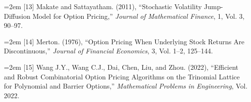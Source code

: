 \begin{flushleft}
\hangindent=2em
[13] Makate and Sattayatham. (2011), “Stochastic Volatility Jump-Diffusion Model for Option Pricing,” \emph{Journal of Mathematical Finance}, 1, Vol. 3, 90–97.

\hangindent=2em
[14] Merton. (1976), “Option Pricing When Underlying Stock Returns Are Discontinuous,” \emph{Journal of Financial Economics}, 3, Vol. 1–2, 125–144.

\hangindent=2em
[15] Wang J.Y., Wang C.J., Dai, Chen, Liu, and Zhou. (2022), “Efficient and Robust Combinatorial Option Pricing Algorithms on the Trinomial Lattice for Polynomial and Barrier Options,” \emph{Mathematical Problems in Engineering}, Vol. 2022.
\end{flushleft}